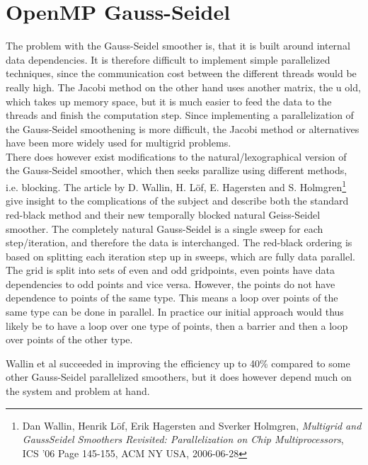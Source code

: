 \section{OpenMP Gauss-Seidel}
The problem with the Gauss-Seidel smoother is, that it is built around internal data dependencies. It is therefore difficult to implement simple parallelized techniques, since the communication cost between the different threads would be really high. The Jacobi method on the other hand uses another matrix, the u old, which takes up memory space, but it is much easier to feed the data to the threads and finish the computation step. Since implementing a parallelization of the Gauss-Seidel smoothening is more difficult, the Jacobi method or alternatives have been more widely used for multigrid problems.\\

There does however exist modifications to the natural/lexographical version of the Gauss-Seidel smoother, which then seeks parallize using different methods, i.e. blocking. The article by D. Wallin, H. L\"{o}f, E. Hagersten and S. Holmgren\footnote{Dan Wallin, Henrik L\"{o}f, Erik Hagersten and Sverker Holmgren, \textit{Multigrid and GaussSeidel
Smoothers Revisited:
Parallelization on Chip Multiprocessors}, ICS '06 Page 145-155, ACM NY USA, 2006-06-28}  give insight to the complications of the subject and describe both the standard red-black method and their new temporally blocked natural Geiss-Seidel smoother. The completely natural Gauss-Seidel is a single sweep for each step/iteration, and therefore the data is interchanged. The red-black ordering is based on splitting each iteration step up in sweeps, which are fully data parallel. The grid is split into sets of even and odd gridpoints, even points have data dependencies to odd points and vice versa. However, the points do not have dependence to points of the same type. This means a loop over points of the same type can be done in parallel. In practice our initial approach would thus likely be to have a loop over one type of points, then a barrier and then a loop over points of the other type.

Wallin et al succeeded in improving the efficiency up to 40\% compared to some other Gauss-Seidel parallelized smoothers, but it does however depend much on the system and problem at hand.


